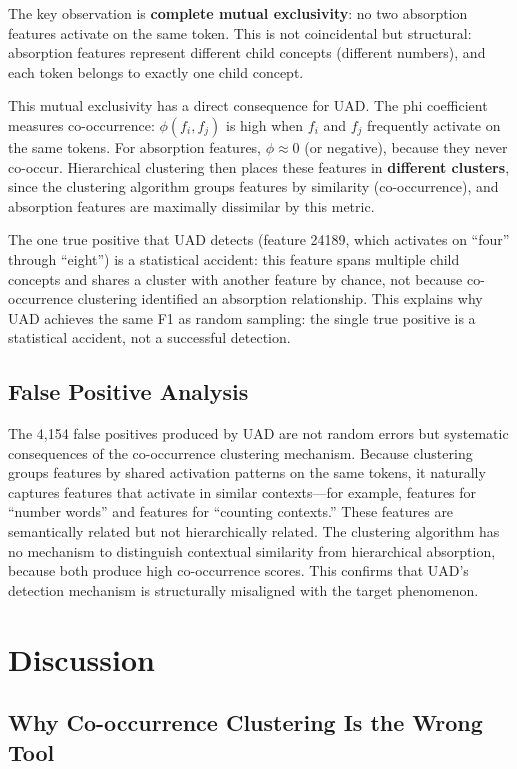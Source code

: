 \documentclass{article}
\begin{document}
The key observation is \textbf{complete mutual exclusivity}: no two absorption features activate on the same token. This is not coincidental but structural: absorption features represent different child concepts (different numbers), and each token belongs to exactly one child concept.

This mutual exclusivity has a direct consequence for UAD. The phi coefficient measures co-occurrence: $\phi(f_i, f_j)$ is high when $f_i$ and $f_j$ frequently activate on the same tokens. For absorption features, $\phi \approx 0$ (or negative), because they never co-occur. Hierarchical clustering then places these features in \textbf{different clusters}, since the clustering algorithm groups features by similarity (co-occurrence), and absorption features are maximally dissimilar by this metric.

The one true positive that UAD detects (feature 24189, which activates on ``four'' through ``eight'') is a statistical accident: this feature spans multiple child concepts and shares a cluster with another feature by chance, not because co-occurrence clustering identified an absorption relationship. This explains why UAD achieves the same F1 as random sampling: the single true positive is a statistical accident, not a successful detection.

\subsection{False Positive Analysis}

The 4,154 false positives produced by UAD are not random errors but systematic consequences of the co-occurrence clustering mechanism. Because clustering groups features by shared activation patterns on the same tokens, it naturally captures features that activate in similar contexts---for example, features for ``number words'' and features for ``counting contexts.'' These features are semantically related but not hierarchically related. The clustering algorithm has no mechanism to distinguish contextual similarity from hierarchical absorption, because both produce high co-occurrence scores. This confirms that UAD's detection mechanism is structurally misaligned with the target phenomenon.

\section{Discussion}
\label{sec:discussion}

\subsection{Why Co-occurrence Clustering Is the Wrong Tool}
\end{document}
